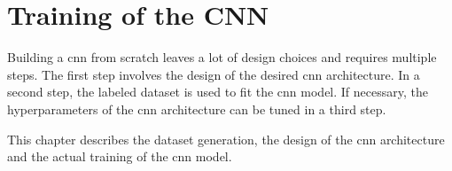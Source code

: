 \chapter{Training of the CNN}
\label{ch:training_of_the_cnn}

Building a \acrlong{cnn} from scratch leaves a lot of design choices and requires multiple steps.
The first step involves the design of the desired \acrshort{cnn} architecture. %
In a second step, the labeled dataset is used to fit the \acrshort{cnn} model.
If necessary, the hyperparameters of the \acrshort{cnn} architecture can be tuned in a third step.

This chapter describes the dataset generation, the design of the \acrshort{cnn} architecture and the actual training of the \acrshort{cnn} model. %




